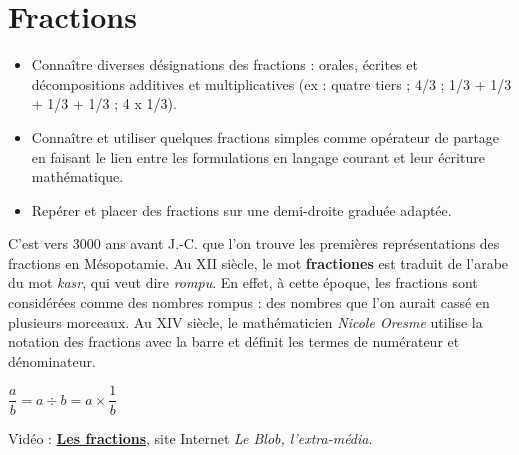 \themaN
\graphicspath{{../Ch9_Fractions/Images/}}

\chapter{Fractions}
\label{C11}


\begin{prerequis}
   \begin{itemize}
      \item Connaître diverses désignations des fractions : orales, écrites et décompositions additives et multiplicatives (ex : quatre tiers ; 4/3 ; 1/3 + 1/3 + 1/3 + 1/3 ; 4 x 1/3).
      \item Connaître et utiliser quelques fractions simples comme opérateur de partage en faisant le lien entre les formulations en langage courant et leur écriture mathématique.
      \item Repérer et placer des fractions sur une demi-droite graduée adaptée.
   \end{itemize}
\end{prerequis}

\vfill

\begin{debat} 
   C'est vers 3000 ans avant J.-C. que l'on trouve les premières représentations des fractions en Mésopotamie. Au {\small XII} siècle, le mot {\bf fractiones} est traduit de l'arabe du mot {\it kasr}, qui veut dire {\it rompu}. En effet, à cette époque, les fractions sont considérées comme des nombres rompus : des nombres que l'on aurait cassé en plusieurs morceaux. Au {\small XIV} siècle, le mathématicien {\it Nicole Oresme} utilise la notation des fractions avec la barre et définit les termes de numérateur et dénominateur.
   \begin{center}
      \textcolor{B1}{\fontsize{30}{30}\selectfont $\dfrac{a}{b} =a\div b =a\times\dfrac{1}{b}$}
   \end{center}
   \bigskip
   \begin{cadre}[B2][F4]
      \begin{center}
         Vidéo : \href{https://leblob.fr/fondamental/les-fractions}{\bf Les fractions}, site Internet {\it Le Blob, l'extra-média}.
      \end{center}
   \end{cadre}
\end{debat}

